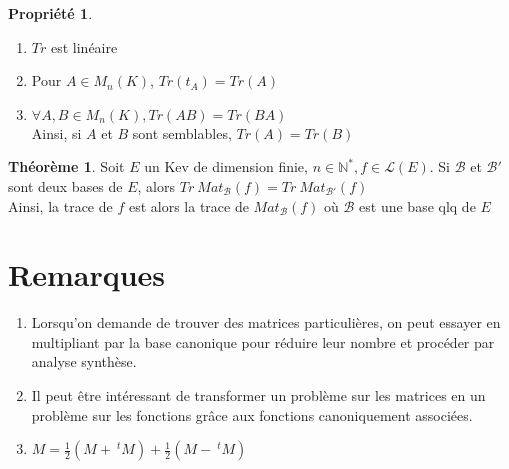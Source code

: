 \documentclass[fleqn]{article}
\theoremstyle{definition} \newtheorem*{defi}{D\'efinition}
\theoremstyle{definition} \newtheorem*{theo}{Th\'eor\`eme}
\theoremstyle{definition} \newtheorem*{coro}{Corollaire}
\theoremstyle{definition} \newtheorem*{nota}{Notation}
\theoremstyle{definition} \newtheorem*{vocab}{Vocabulaire}
\theoremstyle{remark} \newtheorem*{rqs}{Remarques}
\theoremstyle{definition} \newtheorem*{prop}{Propri\'et\'e}
\begin{document}
\begin{prop} $ $
	\begin{enumerate}
		\item $Tr$ est lin\'eaire
		\item Pour $A \in M_n(K)$, $Tr(t_A) = Tr(A)$
		\item $\forall A,B \in M_n(K), Tr(AB) = Tr(BA)$ \\
			Ainsi, si $A$ et $B$ sont semblables, $Tr(A) = Tr(B)$
	\end{enumerate}
\end{prop}

\begin{theo}
	Soit $E$ un Kev de dimension finie, $n \in \mathbb{N}^*, f \in \mathscr{L}(E)$. Si $\mathscr{B}$ et $\mathscr{B}'$ sont deux bases de $E$,
	alors $Tr\ Mat_{\mathscr{B}}(f) = Tr\ Mat_{\mathscr{B}'}(f)$ \\
	Ainsi, la trace de $f$ est alors la trace de $Mat_{\mathscr{B}}(f)$ o\`u $\mathscr{B}$ est une base qlq de $E$
\end{theo}

\section{Remarques}

\begin{enumerate}
	\item Lorsqu'on demande de trouver des matrices particuli\`eres, on peut essayer en multipliant par la base canonique pour r\'eduire leur
		nombre et proc\'eder par analyse synth\`ese.
	\item Il peut \^etre int\'eressant de transformer un probl\`eme sur les matrices en un probl\`eme sur les fonctions gr\^ace aux fonctions
		canoniquement associ\'ees.
	\item $M = \frac{1}{2}(M +\ ^t M) + \frac{1}{2}(M -\ ^t M)$
\end{enumerate}
\end{document}

